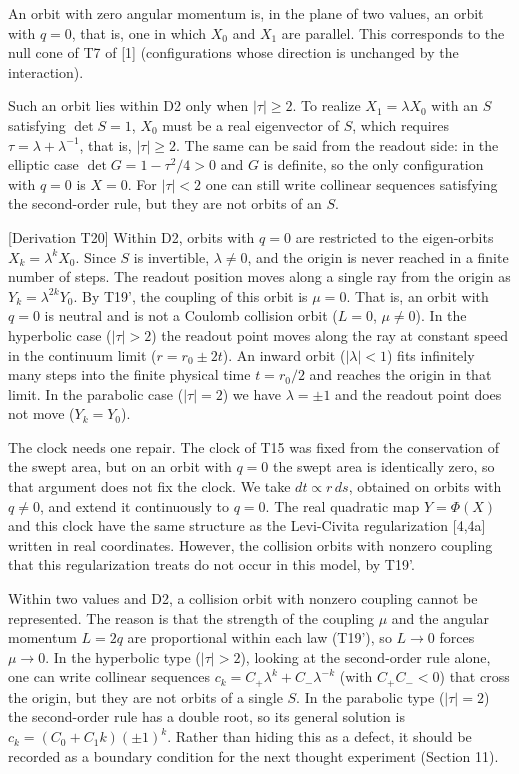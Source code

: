 \documentclass[
  a4paper,
]{article}
\begin{document}
An orbit with zero angular momentum is, in the plane of two values, an
orbit with \(q=0\), that is, one in which \(X_0\) and \(X_1\) are
parallel. This corresponds to the null cone of T7 of {[}1{]}
(configurations whose direction is unchanged by the interaction).

Such an orbit lies within D2 only when \(\lvert\tau\rvert\ge2\). To
realize \(X_1=\lambda X_0\) with an \(S\) satisfying \(\det S=1\),
\(X_0\) must be a real eigenvector of \(S\), which requires
\(\tau=\lambda+\lambda^{-1}\), that is, \(\lvert\tau\rvert\ge2\). The
same can be said from the readout side: in the elliptic case
\(\det G=1-\tau^2/4>0\) and \(G\) is definite, so the only configuration
with \(q=0\) is \(X=0\). For \(\lvert\tau\rvert<2\) one can still write
collinear sequences satisfying the second-order rule, but they are not
orbits of an \(S\).

{[}Derivation T20{]} Within D2, orbits with \(q=0\) are restricted to
the eigen-orbits \(X_k=\lambda^kX_0\). Since \(S\) is invertible,
\(\lambda\neq0\), and the origin is never reached in a finite number of
steps. The readout position moves along a single ray from the origin as
\(Y_k=\lambda^{2k}Y_0\). By T19', the coupling of this orbit is
\(\mu=0\). That is, an orbit with \(q=0\) is neutral and is not a
Coulomb collision orbit (\(L=0\), \(\mu\neq0\)). In the hyperbolic case
(\(\lvert\tau\rvert>2\)) the readout point moves along the ray at
constant speed in the continuum limit (\(r=r_0\pm2t\)). An inward orbit
(\(\lvert\lambda\rvert<1\)) fits infinitely many steps into the finite
physical time \(t=r_0/2\) and reaches the origin in that limit. In the
parabolic case (\(\lvert\tau\rvert=2\)) we have \(\lambda=\pm1\) and the
readout point does not move (\(Y_k=Y_0\)).

The clock needs one repair. The clock of T15 was fixed from the
conservation of the swept area, but on an orbit with \(q=0\) the swept
area is identically zero, so that argument does not fix the clock. We
take \(dt\propto r\,ds\), obtained on orbits with \(q\neq0\), and extend
it continuously to \(q=0\). The real quadratic map \(Y=\Phi(X)\) and
this clock have the same structure as the Levi-Civita regularization
{[}4,4a{]} written in real coordinates. However, the collision orbits
with nonzero coupling that this regularization treats do not occur in
this model, by T19'.

Within two values and D2, a collision orbit with nonzero coupling cannot
be represented. The reason is that the strength of the coupling \(\mu\)
and the angular momentum \(L=2q\) are proportional within each law
(T19'), so \(L\to0\) forces \(\mu\to0\). In the hyperbolic type
(\(\lvert\tau\rvert>2\)), looking at the second-order rule alone, one
can write collinear sequences \(c_k=C_+\lambda^k+C_-\lambda^{-k}\) (with
\(C_+C_-<0\)) that cross the origin, but they are not orbits of a single
\(S\). In the parabolic type (\(\lvert\tau\rvert=2\)) the second-order
rule has a double root, so its general solution is
\(c_k=(C_0+C_1k)(\pm1)^k\). Rather than hiding this as a defect, it
should be recorded as a boundary condition for the next thought
experiment (Section 11).
\end{document}
